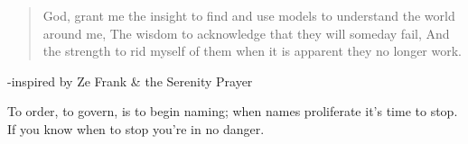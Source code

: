 \cleardoublepage
\setcounter{savepage}{\thepage}
\begin{abstractpage}

\end{abstractpage}



%
%
%
%




% 

\clearpage
\hspace{0pt}
\vfill
\blockquote{\footnotesize
 God, grant me the insight to find and use models to understand the world around me, \newline The wisdom to acknowledge that they will someday fail, \newline And the strength to rid myself of them when it is apparent they no longer work.}

\hspace{40mm}-inspired by Ze Frank \& the Serenity Prayer

\vfill

\begin{singlespace}
\footnotesize   
\hspace*{52mm} To order, to govern, \newline
\hspace*{59mm} is to begin naming; \newline
\hspace*{55mm} when names proliferate \newline
\hspace*{60mm} it's time to stop. \newline
\hspace*{54mm} If you know when to stop \newline
\hspace*{59mm} you're in no danger. \newline
\end{singlespace}


